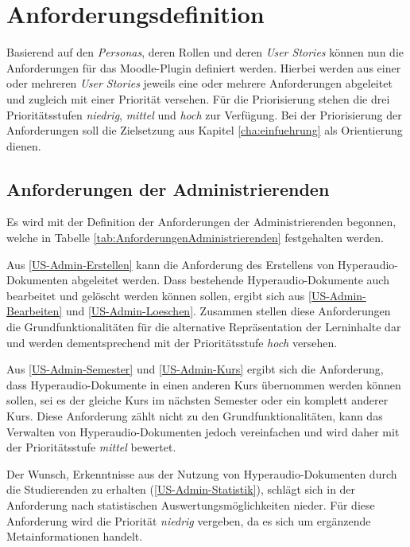 \section{Anforderungsdefinition}
\label{sec:anforderungsdefinition}
Basierend auf den \textit{Personas}, deren Rollen und deren \textit{User Stories} können nun die Anforderungen für das Moodle-Plugin definiert werden. Hierbei werden aus einer oder mehreren \textit{User Stories} jeweils eine oder mehrere Anforderungen abgeleitet und zugleich mit einer Priorität versehen. Für die Priorisierung stehen die drei Prioritätsstufen \textit{niedrig}, \textit{mittel} und \textit{hoch} zur Verfügung. Bei der Priorisierung der Anforderungen soll die Zielsetzung aus Kapitel \ref{cha:einfuehrung} als Orientierung dienen.

\subsection{Anforderungen der Administrierenden}
Es wird mit der Definition der Anforderungen der Administrierenden begonnen, welche in Tabelle \ref{tab:AnforderungenAdministrierenden} festgehalten werden. 

Aus \ref{US-Admin-Erstellen} kann die Anforderung des Erstellens von Hyperaudio-Dokumenten abgeleitet werden. Dass bestehende Hyperaudio-Dokumente auch bearbeitet und gelöscht werden können sollen, ergibt sich aus \ref{US-Admin-Bearbeiten} und \ref{US-Admin-Loeschen}. Zusammen stellen diese Anforderungen die Grundfunktionalitäten für die alternative Repräsentation der Lerninhalte dar und werden dementsprechend mit der Prioritätsstufe \textit{hoch} versehen.

Aus \ref{US-Admin-Semester} und \ref{US-Admin-Kurs} ergibt sich die Anforderung, dass Hyperaudio-Dokumente in einen anderen Kurs übernommen werden können sollen, sei es der gleiche Kurs im nächsten Semester oder ein komplett anderer Kurs. Diese Anforderung zählt nicht zu den Grundfunktionalitäten, kann das Verwalten von Hyperaudio-Dokumenten jedoch vereinfachen und wird daher mit der Prioritätsstufe \textit{mittel} bewertet.

Der Wunsch, Erkenntnisse aus der Nutzung von Hyperaudio-Dokumenten durch die Studierenden zu erhalten (\ref{US-Admin-Statistik}), schlägt sich in der Anforderung nach statistischen Auswertungsmöglichkeiten nieder. Für diese Anforderung wird die Priorität \textit{niedrig} vergeben, da es sich um ergänzende Metainformationen handelt.

